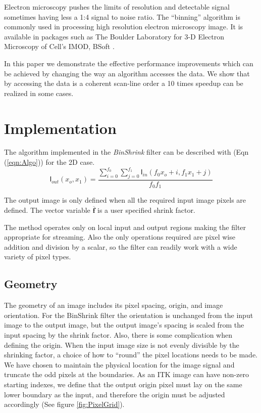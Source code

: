 \documentclass{InsightArticle}
\begin{document}
Electron microscopy  pushes the limits of resolution and detectable
signal sometimes having less a 1:4 signal to noise ratio.
The ``binning'' algorithm is commonly used in processing high
resolution electron microscopy image. It is available in packages such
as The Boulder Laboratory for 3-D Electron Microscopy of Cell's
IMOD\cite{IMOD}, BSoft \cite{bsoft2007}.

In this paper we demonstrate the effective performance improvements which
can be achieved by changing the way an algorithm accesses the data. We
show that by accessing the data is a coherent scan-line order
a 10 times speedup can be realized in some cases.

\section{Implementation}

The algorithm implemented in the \textit{BinShrink} filter can be
described with (Eqn (\ref{eqn:Algo})) for the 2D case.
\begin{equation}
\label{eqn:Algo}
\mathsf{I}_{out}(x_o,x_1) = \frac{\sum_{i=0}^{f_0}\sum_{j=0}^{f_1}\mathsf{I}_{in}(f_0 x_o+i,f_1 x_1+j)}{f_0 f_1}
\end{equation}

The output image is only defined when all the required input image
pixels are defined. The vector variable $\mathbf{\overline{f}}$ is a user specified
shrink factor.

The method operates only on local input and output regions making the
filter appropriate for streaming. Also the only operations required are
pixel wise addition and division by a scalar, so the filter can readily
work with a wide variety of pixel types.

\subsection{Geometry}

The geometry of an image includes its pixel spacing, origin, and
image orientation. For the BinShrink filter the orientation is
unchanged from the input image to the output image, but the output
image's spacing is scaled from the input spacing by the shrink factor.
Also, there is some complication when defining the origin. When the input image size is
not evenly divisible by the shrinking factor, a choice of how to
``round'' the pixel locations needs to be made. We have chosen to maintain the physical
location for the image signal and truncate the odd pixels at the
boundaries. As an ITK image can have non-zero starting indexes, we define
that the output origin pixel must lay on the same lower boundary as the
input, and therefore the origin must be adjusted accordingly (See figure \ref{fig:PixelGrid}).
\end{document}
